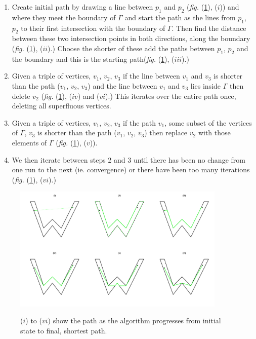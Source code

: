 \documentclass[a4paper,10pt]{amsart}
\newcommand{\fig}[1]{\emph{fig.} (\ref{#1})}
\begin{document}
\begin{enumerate}
\item Create initial path by drawing a line between $p_1$ and $p_2$ (\fig{wdia}, ($i$)) and where they meet the boundary of $\Gamma$ and start the path as the lines from $p_1$, $p_2$ to their first intersection with the boundary of $\Gamma$. Then find the distance between these two intersection points in both directions, along the boundary (\fig{wdia}, ($ii$).) Choose the shorter of these add the paths between $p_1$, $p_2$ and the boundary and this is the starting path(\fig{wdia}, ($iii$).) 
\item Given a triple of vertices, $v_1$, $v_2$, $v_3$ if the line between $v_1$ and $v_3$ is shorter than the path ($v_1$, $v_2$, $v_3$) and the line between $v_1$ and $v_3$ lies inside $\Gamma$ then delete $v_2$ (\fig{wdia}, ($iv$) and ($vi$).) This iterates over the entire path once, deleting all superfluous vertices. 
\item Given a triple of vertices, $v_1$, $v_2$, $v_3$ if the path $v_1$, some subset of the vertices of $\Gamma$, $v_3$ is shorter than the path ($v_1$, $v_2$, $v_3$) then replace $v_2$ with those elements of $\Gamma$ (\fig{wdia}, ($v$)). 
\item We then iterate between steps 2 and 3 until there has been no change from one run to the next (ie. convergence) or there have been too many iterations (\fig{wdia}, ($vi$).)
\end{enumerate}

\begin{figure}
\centering
\includegraphics[trim=0in 0.5in 0in 0.25in, width=4in]{figs/wdia.pdf} \\
\caption{($i$) to ($vi$) show the path as the algorithm progresses from initial state to final, shortest path. }
\label{wdia}
\end{figure}
\end{document}
